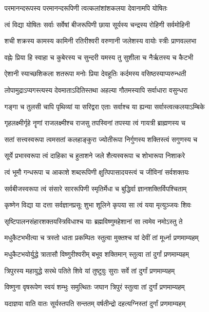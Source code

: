 \twolineshloka
{परमानन्दरूपस्य परमानन्दरूपिणी}
{त्वत्कलांशांशकलया देवानामपि योषितः}

\twolineshloka
{त्वं विद्या योषितः सर्वाः सर्वेषां बीजरूपिणी}
{छाया सूर्यस्य चन्द्रस्य रोहिणी सर्वमोहिनी}

\twolineshloka
{शची शक्रस्य कामस्य कामिनी रतिरीश्वरी}
{वरुणानी जलेशस्य वायोः स्त्रीः प्राणवल्लभा}

\twolineshloka
{वह्नेः प्रिया हि स्वाहा च कुबेरस्य च सुन्दरी}
{यमस्य तु सुशीला च नैर्ऋतस्य च कैटभी}

\twolineshloka
{ऐशानी स्याच्छशिकला शतरूपा मनोः प्रिया}
{देवहूतिः कर्दमस्य वसिष्ठस्याप्यरुन्धती}

\twolineshloka
{लोपामुद्राऽप्यगस्त्यस्य देवमाताऽदितिस्तथा}
{अहल्या गौतमस्यापि सर्वाधारा वसुन्धरा}

\twolineshloka
{गङ्गा च तुलसी चापि पृथिव्यां या सरिद्वरा}
{एताः सर्वाश्च या ह्यन्या सर्वास्त्वत्कलयाऽम्बिके}

\twolineshloka
{गृहलक्ष्मीर्गृहे नॄणां राजलक्ष्मीश्च राजसु}
{तपस्विनां तपस्या त्वं गायत्री ब्राह्मणस्य च}

\twolineshloka
{सतां सत्त्‍‌वस्वरूपा त्वमसतां कलहाङ्कुरा}
{ज्योतीरूपा निर्गुणस्य शक्तिस्त्वं सगुणस्य च}

\twolineshloka
{सूर्ये प्रभास्वरूपा त्वं दाहिका च हुताशने}
{जले शैत्यस्वरूपा च शोभारूपा निशाकरे}

\twolineshloka
{त्वं भूमौ गन्धरूपा च आकाशे शब्दरूपिणी}
{क्षुत्पिपासादयस्त्वं च जीविनां सर्वशक्तयः}

\twolineshloka
{सर्वबीजस्वरूपा त्वं संसारे साररूपिणी}
{स्मृतिर्मेधा च बुद्धिर्वा ज्ञानशक्तिर्विपश्चिताम्}

\twolineshloka
{कृष्णेन विद्या या दत्ता सर्वज्ञानप्रसूः शुभा}
{शूलिने कृपया सा त्वं यया मृत्युञ्जयः शिवः}

\twolineshloka
{सृष्टिपालनसंहारशक्तयस्त्रिविधाश्च याः}
{ब्रह्मविष्णुमहेशानां सा त्वमेव नमोऽस्तु ते}

\twolineshloka
{मधुकैटभभीत्या च त्रस्तो धाता प्रकम्पितः}
{स्तुत्वा मुक्तश्च यां देवीं तां मूर्ध्ना प्रणमाम्यहम्}

\twolineshloka
{मधुकैटभयोर्युद्धे त्रातासौ विष्णुरीश्वरीम्}
{बभूव शक्तिमान् स्तुत्वा तां दुर्गां प्रणमाम्यहम्}

\twolineshloka
{त्रिपुरस्य महायुद्धे सरथे पतिते शिवे}
{यां तुष्टुवुः सुराः सर्वे तां दुर्गां प्रणमाम्यहम्}

\twolineshloka
{विष्णुना वृषरूपेण स्वयं शम्भुः समुत्थितः}
{जघान त्रिपुरं स्तुत्वा तां दुर्गां प्रणमाम्यहम्}

\twolineshloka
{यदाज्ञया वाति वातः सूर्यस्तपति सन्ततम्}
{वर्षतीन्द्रो दहत्यग्निस्तां दुर्गां प्रणमाम्यहम्}

